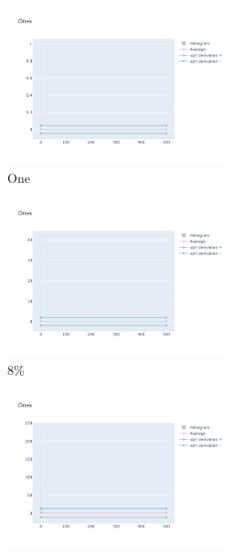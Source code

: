\documentclass[12pt, fleqn]{report}                             %
\theoremstyle{break}                                            %
\begin{document}
        \begin{figure}[h!]
          \centering
          \begin{subfigure}[b]{0.4\linewidth}
            \includegraphics[width=0.7\textwidth]{Images/160/dia-a.png}
            \caption{One}
          \end{subfigure}
          \begin{subfigure}[b]{0.4\linewidth}
            \includegraphics[width=0.7\textwidth]{Images/160/dia-b.png}
            \caption{8\%}
          \end{subfigure}
          \begin{subfigure}[b]{0.4\linewidth}
            \includegraphics[width=0.7\textwidth]{Images/160/dia-c.png}

\end{subfigure}
\end{figure}
\end{document}
